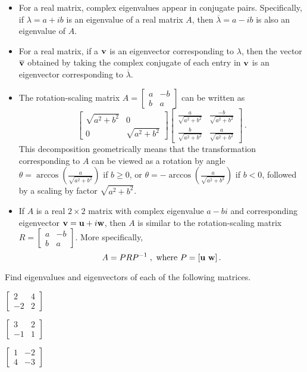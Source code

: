 \begin{itemize}
\item For a real matrix, complex eigenvalues appear in conjugate pairs. Specifically, if $\lambda=a+ib$ is an eigenvalue of a real matrix $A$, then $\overline{\lambda}=a-ib$ is also an eigenvalue of $A$.
\item For a real matrix, if a $\mathbf{v}$ is an eigenvector corresponding to $\lambda$, then the vector $\overline{\mathbf{v}}$ obtained by taking the complex conjugate of each entry in $\mathbf{v}$ is an eigenvector corresponding to $\overline{\lambda}$.
\item The rotation-scaling matrix $A=\left[ \begin{array}{cr} a&-b \\ b&a \end{array} \right]$ can be written as 
\[ \left[ \begin{array}{cc} \sqrt{a^2+b^2} &0 \\ 0&\sqrt{a^2+b^2} \end{array} \right] \left[ \begin{array}{cc} \frac{a}{\sqrt{a^2+b^2}}&\frac{-b}{\sqrt{a^2+b^2}} \\ \frac{b}{\sqrt{a^2+b^2}}&\frac{a}{\sqrt{a^2+b^2}}\end{array} \right] \, .\]
This decomposition geometrically means that the transformation corresponding to $A$ can be viewed as a rotation by angle $\theta=\arccos\left(\frac{a}{\sqrt{a^2+b^2}}\right)$ if $b\geq 0$, or $\theta=-\arccos\left(\frac{a}{\sqrt{a^2+b^2}}\right)$ if $b<0$, followed by a scaling by factor $\sqrt{a^2+b^2}$. 
\item If $A$ is a real $2\times 2$ matrix with complex eigenvalue $a-bi$ and corresponding eigenvector $\mathbf{v}=\mathbf{u}+i\mathbf{w}$, then $A$ is similar to the rotation-scaling matrix $R=\left[ \begin{array}{cr} a&-b \\ b&a \end{array} \right]$. More specifically,
\[ A=PRP^{-1} \; , \text{ where } P=[ \mathbf{u} \ \mathbf{w} ]\, .\]
\end{itemize}


\label{sec:comp_eigen_exer}
\be
\item Find eigenvalues and eigenvectors of each of the following matrices.
\ba \item $\left[ \begin{array}{rc} 2&4 \\ -2&2 \end{array} \right]$
\item $\left[ \begin{array}{rc} 3&2 \\ -1&1 \end{array} \right]$
\item $\left[ \begin{array}{cr} 1&-2 \\ 4&-3 \end{array} \right]$
\ea

